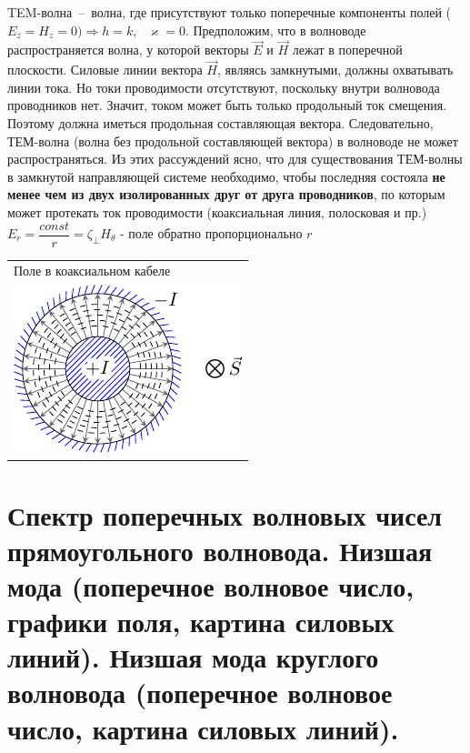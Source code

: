 \begin{multicols*}{2}
		TEM-волна~--~волна, где присутствуют только поперечные компоненты полей ($E_z = H_z = 0) \Rightarrow h = k$,~ $\varkappa = 0$. Предположим, что в волноводе распространяется волна, у которой векторы $\vec{E}$ и $\vec{H}$ лежат в поперечной плоскости. Силовые линии вектора $\vec{H}$, являясь замкнутыми, должны охватывать линии тока. Но токи проводимости отсутствуют, поскольку внутри волновода проводников нет. Значит, током может быть только продольный ток смещения. Поэтому должна иметься продольная составляющая вектора. Следовательно, ТЕМ-волна (волна без продольной составляющей вектора) в волноводе не может распространяться. Из этих рассуждений ясно, что для существования ТЕМ-волны в замкнутой направляющей системе необходимо, чтобы последняя состояла \textbf{не менее чем из двух изолированных друг от друга проводников}, по которым может протекать ток проводимости (коаксиальная линия, полосковая и пр.)\\
		$E_r = \dfrac{const}{r} = \zeta_\perp H_\theta$ - поле обратно пропорционально $r$\\
		\begin{tabular}{l}
			{Поле в коаксиальном кабеле} \\
			\includegraphics[width=0.25\linewidth]{aed_imgs/lect4_ris6} \\
		\end{tabular}
		
		\section{Спектр поперечных волновых чисел прямоугольного волновода. Низшая мода (поперечное волновое число, графики поля, картина силовых линий). Низшая мода круглого волновода (поперечное волновое число, картина силовых линий).}
		

\end{multicols*}
